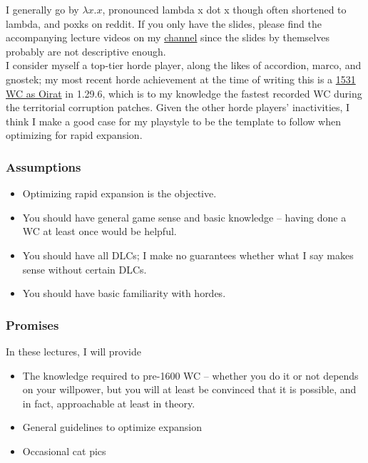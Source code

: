 \begin{frame}
  I generally go by $\lambda x.x$, pronounced lambda x dot x though often
  shortened to lambda, and poxks on reddit. If you only have the slides, please
  find the accompanying lecture videos on my
  \href{https://www.youtube.com/user/Restrong}{channel} since the slides by
  themselves probably are not descriptive enough.
  \\
  I consider myself a top-tier horde player, along the likes of accordion,
  marco, and gnostek; my most recent horde achievement at the time of writing
  this is a
  \href{https://www.reddit.com/r/eu4/comments/gh9by2/1531\_oiratgolden\_hordehre\_true\_one\_tag\_wc\_also\_no/}
  {1531 WC as Oirat} in 1.29.6, which is to my knowledge the fastest recorded WC
  during the territorial corruption patches. Given the other horde
  players' inactivities, I think I make a good case for my playstyle to be the
  template to follow when optimizing for rapid expansion.
\end{frame}

\begin{frame}
  \frametitle{Assumptions}
  \begin{itemize}
    \item Optimizing rapid expansion is the objective.
    \item You should have general game sense and basic knowledge -- having done a WC at least once would be helpful.
    \item You should have all DLCs; I make no guarantees whether what I say
      makes sense without certain DLCs.
    \item You should have basic familiarity with hordes.
  \end{itemize}
\end{frame}

\begin{frame}
  \frametitle{Promises}
  In these lectures, I will provide
  \begin{itemize}
    \item The knowledge required to pre-1600 WC -- whether you do it or not
      depends on your willpower, but you will at least be convinced that it is
      possible, and in fact, approachable at least in theory.
    \item General guidelines to optimize expansion
    \item Occasional cat pics
  \end{itemize}
\end{frame}

